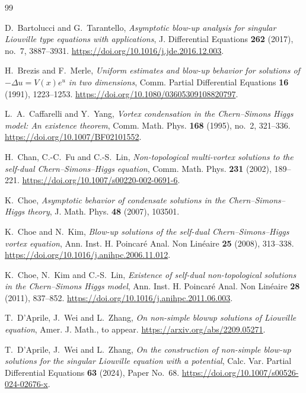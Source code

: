 \documentclass[11pt,reqno]{amsart}
\numberwithin{equation}{section}
\theoremstyle{definition}
\theoremstyle{remark}
\begin{document}
\begin{thebibliography}{99}

D.~Bartolucci and G.~Tarantello,
\emph{Asymptotic blow-up analysis for singular Liouville type equations
with applications},
J. Differential Equations \textbf{262} (2017), no.~7, 3887--3931.
\url{https://doi.org/10.1016/j.jde.2016.12.003}.

H.~Brezis and F.~Merle,
\emph{Uniform estimates and blow-up behavior for solutions of
$-\Delta u=V(x)e^u$ in two dimensions},
Comm. Partial Differential Equations \textbf{16} (1991), 1223--1253.
\url{https://doi.org/10.1080/03605309108820797}.

L.~A.~Caffarelli and Y.~Yang,
\emph{Vortex condensation in the Chern--Simons Higgs model:
An existence theorem},
Comm. Math. Phys. \textbf{168} (1995), no.~2, 321--336.
\url{https://doi.org/10.1007/BF02101552}.

H.~Chan, C.-C.~Fu and C.-S.~Lin,
\emph{Non-topological multi-vortex solutions to the self-dual
Chern--Simons--Higgs equation},
Comm. Math. Phys. \textbf{231} (2002), 189--221.
\url{https://doi.org/10.1007/s00220-002-0691-6}.

K.~Choe,
\emph{Asymptotic behavior of condensate solutions in the
Chern--Simons--Higgs theory},
J. Math. Phys. \textbf{48} (2007), 103501.

K.~Choe and N.~Kim,
\emph{Blow-up solutions of the self-dual Chern--Simons--Higgs vortex
equation},
Ann. Inst. H. Poincar\'e Anal. Non Lin\'eaire \textbf{25} (2008), 313--338.
\url{https://doi.org/10.1016/j.anihpc.2006.11.012}.

K.~Choe, N.~Kim and C.-S.~Lin,
\emph{Existence of self-dual non-topological solutions in the
Chern--Simons Higgs model},
Ann. Inst. H. Poincar\'e Anal. Non Lin\'eaire \textbf{28} (2011), 837--852.
\url{https://doi.org/10.1016/j.anihpc.2011.06.003}.

T.~D'Aprile, J.~Wei and L.~Zhang,
\emph{On non-simple blowup solutions of Liouville equation},
Amer. J. Math., to appear.
\url{https://arxiv.org/abs/2209.05271}.

T.~D'Aprile, J.~Wei and L.~Zhang,
\emph{On the construction of non-simple blow-up solutions for the singular
Liouville equation with a potential},
Calc. Var. Partial Differential Equations \textbf{63} (2024), Paper No.~68.
\url{https://doi.org/10.1007/s00526-024-02676-x}.


\end{thebibliography}
\end{document}

